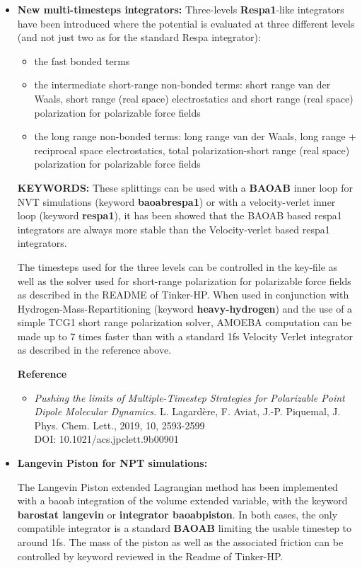 \documentclass[]{article}
\begin{document}
\begin{itemize}
\item \textbf{New multi-timesteps integrators:}
Three-levels \textbf{Respa1}-like integrators have been introduced where the potential is evaluated at three different levels (and not just two as for the standard Respa integrator):
\begin{itemize}
    \item the fast bonded terms
    \item the intermediate short-range non-bonded terms: short range van der Waals, short range (real space) electrostatics and short range (real space) polarization for polarizable force fields
\item the long range non-bonded terms: long range van der Waals, long range     + reciprocal space electrostatics, total polarization-short range (real     space) polarization for polarizable force fields
\end{itemize}

\textbf{KEYWORDS:} These splittings can be used with a \textbf{BAOAB} inner loop for NVT simulations (keyword \textbf{baoabrespa1}) or with a velocity-verlet inner loop (keyword \textbf{respa1}), it has been showed that the BAOAB based respa1 integrators are always more stable than the Velocity-verlet based respa1 integrators.

 The timesteps used for the three levels can be controlled in the key-file as well as the solver used for short-range polarization for polarizable force fields as described in the README of Tinker-HP. When used in conjunction with Hydrogen-Mass-Repartitioning (keyword \textbf{heavy-hydrogen}) and the use of a simple TCG1 short range polarization solver, AMOEBA computation can be made up to 7 times faster than with a standard 1fs Velocity Verlet integrator as described in the reference above.
 
\textbf{Reference}

\begin{itemize}
    \item {\em Pushing the limits of Multiple-Timestep Strategies for Polarizable Point Dipole Molecular Dynamics.}
L. Lagardère, F. Aviat, J.-P. Piquemal, J. Phys. Chem. Lett., 2019, 10, 2593-2599 \\ DOI: 10.1021/acs.jpclett.9b00901
\end{itemize}

\item \textbf{Langevin Piston for NPT simulations:}

The Langevin Piston extended Lagrangian method has been implemented with a baoab integration of the volume extended variable, with the keyword \textbf{barostat langevin} or \textbf{integrator baoabpiston}. In both cases, the only compatible integrator is a standard \textbf{BAOAB} limiting the usable timestep to around 1fs. The mass of the piston as well as the associated friction can be controlled by keyword reviewed in the Readme  of Tinker-HP.


\end{itemize}
\end{document}
